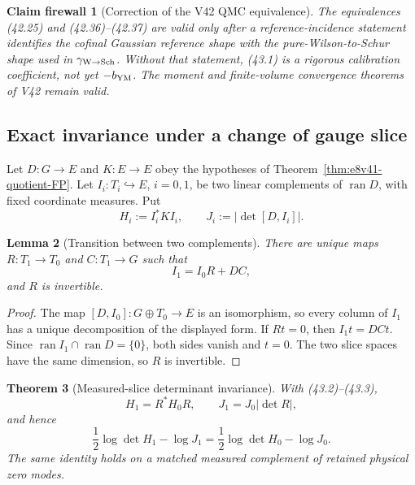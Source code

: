 \documentclass[11pt,oneside]{book}
\newtheorem{theorem}{Theorem}[chapter]
\newtheorem{lemma}[theorem]{Lemma}
\newtheorem{firewall}[theorem]{Claim firewall}
\theoremstyle{definition}
\theoremstyle{remark}
\begin{document}
\begin{firewall}[Correction of the V42 QMC equivalence]
\label{fire:e8v43-reference-correction}
The equivalences (42.25) and (42.36)--(42.37) are valid only after a
reference-incidence statement identifies the cofinal Gaussian
reference shape with the pure-Wilson-to-Schur shape used in
\(\gamma_{\rm W\to Sch}\).  Without that statement, (43.1) is a
rigorous calibration coefficient, not yet
\(-b_{\rm YM}\).  The moment and finite-volume convergence theorems
of V42 remain valid.
\end{firewall}

\subsection{Exact invariance under a change of gauge slice}

Let \(D:G\to E\) and \(K:E\to E\) obey the hypotheses of
Theorem~\ref{thm:e8v41-quotient-FP}.  Let
\(I_i:T_i\hookrightarrow E\), \(i=0,1\), be two linear complements
of \(\operatorname{ran}D\), with fixed coordinate measures.  Put
\[
 H_i:=I_i^*KI_i,\qquad
 J_i:=|\det[D,I_i]|.                                            \tag{43.2}
\]

\begin{lemma}[Transition between two complements]
\label{lem:e8v43-complement-transition}
There are unique maps \(R:T_1\to T_0\) and \(C:T_1\to G\) such that
\[
 I_1=I_0R+DC,                                                   \tag{43.3}
\]
and \(R\) is invertible.
\end{lemma}

\begin{proof}
The map \([D,I_0]:G\oplus T_0\to E\) is an isomorphism, so every
column of \(I_1\) has a unique decomposition of the displayed form.
If \(Rt=0\), then \(I_1t=DCt\).  Since
\(\operatorname{ran}I_1\cap\operatorname{ran}D=\{0\}\), both sides
vanish and \(t=0\).  The two slice spaces have the same dimension,
so \(R\) is invertible.
\end{proof}

\begin{theorem}[Measured-slice determinant invariance]
\label{thm:e8v43-slice-invariance}
With (43.2)--(43.3),
\[
 H_1=R^*H_0R,\qquad
 J_1=J_0|\det R|,                                               \tag{43.4}
\]
and hence
\[
 \boxed{
 \frac12\log\det H_1-\log J_1
 =\frac12\log\det H_0-\log J_0.}                               \tag{43.5}
\]
The same identity holds on a matched measured complement of retained
physical zero modes.
\end{theorem}
\end{document}
